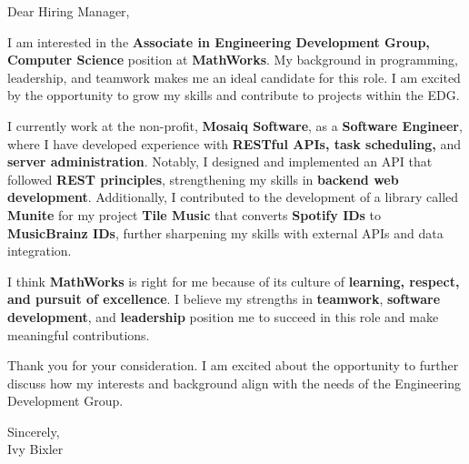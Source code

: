 \documentclass[11pt,letter]{moderncv}
\begin{document}
\date{\today}
\opening{Dear Hiring Manager,}


\makelettertitle

I am interested in the \textbf{Associate in Engineering Development Group, Computer Science} position at \textbf{MathWorks}. My background in programming, leadership, and teamwork makes me an ideal candidate for this role. I am excited by the opportunity to grow my skills and contribute to projects within the EDG.

I currently work at the non-profit, \textbf{Mosaiq Software}, as a \textbf{Software Engineer}, where I have developed experience with \textbf{RESTful APIs, task scheduling,} and \textbf{server administration}. Notably, I designed and implemented an API that followed \textbf{REST principles}, strengthening my skills in \textbf{backend web development}. Additionally, I contributed to the development of a library called \textbf{Munite} for my project \textbf{Tile Music} that converts \textbf{Spotify IDs} to \textbf{MusicBrainz IDs}, further sharpening my skills with external APIs and data integration.

I think \textbf{MathWorks} is right for me because of its culture of \textbf{learning, respect, and pursuit of excellence}. I believe my strengths in \textbf{teamwork}, \textbf{software development}, and \textbf{leadership} position me to succeed in this role and make meaningful contributions.

Thank you for your consideration. I am excited about the opportunity to further discuss how my interests and background align with the needs of the Engineering Development Group.

\vspace{1.5em}
\noindent
Sincerely,\\
Ivy Bixler
\end{document}
